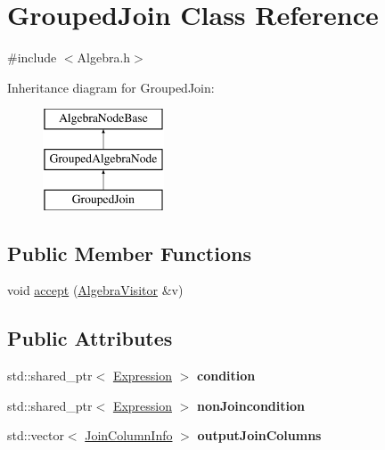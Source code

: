 \hypertarget{class_grouped_join}{\section{Grouped\+Join Class Reference}
\label{class_grouped_join}
}


{\ttfamily \#include $<$Algebra.\+h$>$}

Inheritance diagram for Grouped\+Join\+:\begin{figure}[H]
\begin{center}
\leavevmode
\includegraphics[height=3.000000cm]{class_grouped_join}
\end{center}
\end{figure}
\subsection*{Public Member Functions}
\begin{DoxyCompactItemize}
\item 
void \hyperlink{class_grouped_join_aa067c1a349478bfdeae77ed3a541375d}{accept} (\hyperlink{class_algebra_visitor}{Algebra\+Visitor} \&v)
\end{DoxyCompactItemize}
\subsection*{Public Attributes}
\begin{DoxyCompactItemize}
\item 
\hypertarget{class_grouped_join_a517b47e21d6852335b50537c474c9c62}{std\+::shared\+\_\+ptr$<$ \hyperlink{class_expression}{Expression} $>$ {\bfseries condition}}\label{class_grouped_join_a517b47e21d6852335b50537c474c9c62}

\item 
\hypertarget{class_grouped_join_ae1cd2d5ce317a02f65249e45451e3391}{std\+::shared\+\_\+ptr$<$ \hyperlink{class_expression}{Expression} $>$ {\bfseries non\+Joincondition}}\label{class_grouped_join_ae1cd2d5ce317a02f65249e45451e3391}

\item 
\hypertarget{class_grouped_join_ab4e436f7abb9990000a7f2ef0596960e}{std\+::vector$<$ \hyperlink{class_join_column_info}{Join\+Column\+Info} $>$ {\bfseries output\+Join\+Columns}}\label{class_grouped_join_ab4e436f7abb9990000a7f2ef0596960e}

\end{DoxyCompactItemize}


